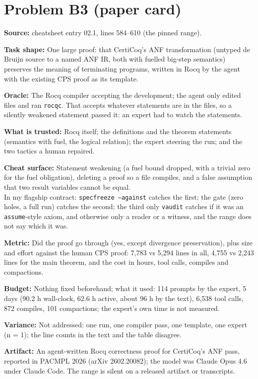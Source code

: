 \documentclass[11pt]{article}
\begin{document}
\section*{Problem B3 (paper card)}\label{ans:B3}
\begin{answer}
\textbf{Source:} cheatsheet entry 02.1, lines 584--610 (the pinned range).

\textbf{Task shape:} One large proof: that CertiCoq's ANF transformation
(untyped de Bruijn source to a named ANF IR, both with fuelled big-step
semantics) preserves the meaning of terminating programs, written in Rocq by
the agent with the existing CPS proof as its template.

\textbf{Oracle:} The Rocq compiler accepting the development; the agent only
edited files and ran \texttt{rocqc}. That accepts whatever statements are in
the files, so a silently weakened statement passed it: an expert had to watch
the statements.

\textbf{What is trusted:} Rocq itself; the definitions and the theorem
statements (semantics with fuel, the logical relation); the expert steering
the run; and the two tactics a human repaired.

\textbf{Cheat surface:} Statement weakening (a fuel bound dropped, with a
trivial zero for the fuel obligation), deleting a proof so a file compiles,
and a false assumption that two result variables cannot be equal. \\
In my flagship contract: \texttt{specfreeze --against} catches the first; the
gate (zero holes, a full run) catches the second; the third only
\texttt{vaudit} catches if it was an \texttt{assume}-style axiom, and otherwise
only a reader or a witness, and the range does not say which it was.

\textbf{Metric:} Did the proof go through (yes, except divergence
preservation), plus size and effort against the human CPS proof: 7,783 vs
5,294 lines in all, 4,755 vs 2,243 lines for the main theorem, and the cost
in hours, tool calls, compiles and compactions.

\textbf{Budget:} Nothing fixed beforehand; what it used: 114 prompts by the
expert, 5 days (90.2 h wall-clock, 62.6 h active, about 96 h by the text),
6,538 tool calls, 872 compiles, 101 compactions; the expert's own time is not
measured.

\textbf{Variance:} Not addressed: one run, one compiler pass, one template,
one expert (n = 1); the line counts in the text and the table disagree.

\textbf{Artifact:} An agent-written Rocq correctness proof for CertiCoq's ANF
pass, reported in PACMPL 2026 (arXiv 2602.20082); the model was Claude Opus 4.6
under Claude Code. The range is silent on a released artifact or transcripts.
\end{answer}
\end{document}
